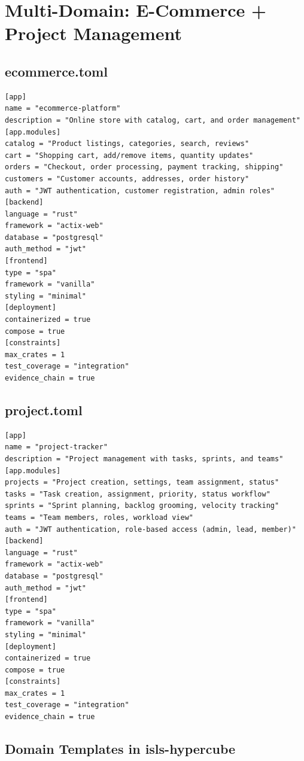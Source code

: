 \documentclass[11pt,a4paper]{article}
\begin{document}
\section{Multi-Domain: E-Commerce + Project Management}

\subsection{ecommerce.toml}

\begin{lstlisting}
[app]
name = "ecommerce-platform"
description = "Online store with catalog, cart, and order management"
[app.modules]
catalog = "Product listings, categories, search, reviews"
cart = "Shopping cart, add/remove items, quantity updates"
orders = "Checkout, order processing, payment tracking, shipping"
customers = "Customer accounts, addresses, order history"
auth = "JWT authentication, customer registration, admin roles"
[backend]
language = "rust"
framework = "actix-web"
database = "postgresql"
auth_method = "jwt"
[frontend]
type = "spa"
framework = "vanilla"
styling = "minimal"
[deployment]
containerized = true
compose = true
[constraints]
max_crates = 1
test_coverage = "integration"
evidence_chain = true
\end{lstlisting}

\subsection{project.toml}

\begin{lstlisting}
[app]
name = "project-tracker"
description = "Project management with tasks, sprints, and teams"
[app.modules]
projects = "Project creation, settings, team assignment, status"
tasks = "Task creation, assignment, priority, status workflow"
sprints = "Sprint planning, backlog grooming, velocity tracking"
teams = "Team members, roles, workload view"
auth = "JWT authentication, role-based access (admin, lead, member)"
[backend]
language = "rust"
framework = "actix-web"
database = "postgresql"
auth_method = "jwt"
[frontend]
type = "spa"
framework = "vanilla"
styling = "minimal"
[deployment]
containerized = true
compose = true
[constraints]
max_crates = 1
test_coverage = "integration"
evidence_chain = true
\end{lstlisting}

\subsection{Domain Templates in isls-hypercube}
\end{document}
